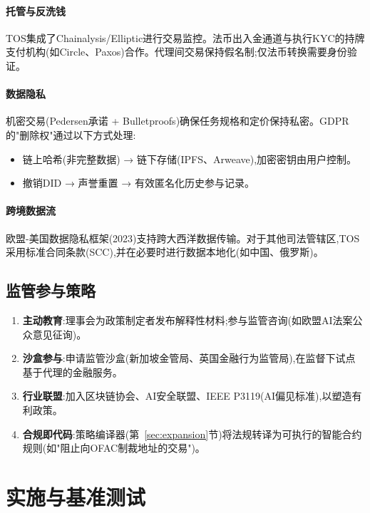 \documentclass[11pt]{article}
\begin{document}
\paragraph{托管与反洗钱}
TOS集成了Chainalysis/Elliptic进行交易监控。法币出入金通道与执行KYC的持牌支付机构(如Circle、Paxos)合作。代理间交易保持假名制;仅法币转换需要身份验证。

\paragraph{数据隐私}
机密交易(Pedersen承诺 + Bulletproofs)确保任务规格和定价保持私密。GDPR的"删除权"通过以下方式处理:
\begin{itemize}[noitemsep]
  \item 链上哈希(非完整数据) → 链下存储(IPFS、Arweave),加密密钥由用户控制。
  \item 撤销DID → 声誉重置 → 有效匿名化历史参与记录。
\end{itemize}

\paragraph{跨境数据流}
欧盟-美国数据隐私框架(2023)支持跨大西洋数据传输。对于其他司法管辖区,TOS采用标准合同条款(SCC),并在必要时进行数据本地化(如中国、俄罗斯)。

\subsection{监管参与策略}

\begin{enumerate}[noitemsep]
  \item \textbf{主动教育}:理事会为政策制定者发布解释性材料;参与监管咨询(如欧盟AI法案公众意见征询)。
  \item \textbf{沙盒参与}:申请监管沙盒(新加坡金管局、英国金融行为监管局),在监督下试点基于代理的金融服务。
  \item \textbf{行业联盟}:加入区块链协会、AI安全联盟、IEEE P3119(AI偏见标准),以塑造有利政策。
  \item \textbf{合规即代码}:策略编译器(第~\ref{sec:expansion}节)将法规转译为可执行的智能合约规则(如"阻止向OFAC制裁地址的交易")。
\end{enumerate}

\section{实施与基准测试}
\label{sec:implementation}
\end{document}
